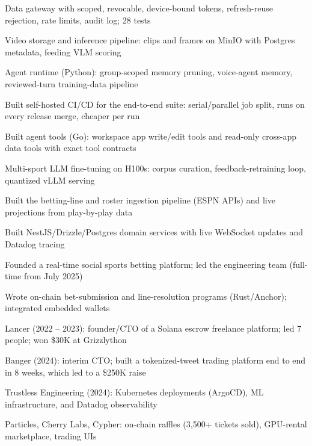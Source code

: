 \documentclass[print]{jack-resume}
\begin{document}
\begin{tightemize}
    \item Data gateway with scoped, revocable, device-bound tokens, refresh-reuse rejection, rate limits, audit log; 28 tests
    \item Video storage and inference pipeline: clips and frames on MinIO with Postgres metadata, feeding VLM scoring
    \item Agent runtime (Python): group-scoped memory pruning, voice-agent memory, reviewed-turn training-data pipeline
    \item Built self-hosted CI/CD for the end-to-end suite: serial/parallel job split, runs on every release merge, cheaper per run
    \item Built agent tools (Go): workspace app write/edit tools and read-only cross-app data tools with exact tool contracts
    \item Multi-sport LLM fine-tuning on H100s: corpus curation, feedback-retraining loop, quantized vLLM serving
\end{tightemize}
\sectionsep

\begin{tightemize}
    \item Built the betting-line and roster ingestion pipeline (ESPN APIs) and live projections from play-by-play data
    \item Built NestJS/Drizzle/Postgres domain services with live WebSocket updates and Datadog tracing
    \item Founded a real-time social sports betting platform; led the engineering team (full-time from July 2025)
    \item Wrote on-chain bet-submission and line-resolution programs (Rust/Anchor); integrated embedded wallets
\end{tightemize}
\sectionsep

\begin{tightemize}
    \item Lancer (2022 – 2023): founder/CTO of a Solana escrow freelance platform; led 7 people; won \$30K at Grizzlython
    \item Banger (2024): interim CTO; built a tokenized-tweet trading platform end to end in 8 weeks, which led to a \$250K raise
    \item Trustless Engineering (2024): Kubernetes deployments (ArgoCD), ML infrastructure, and Datadog observability
    \item Particles, Cherry Labs, Cypher: on-chain raffles (3,500+ tickets sold), GPU-rental marketplace, trading UIs
\end{tightemize}
\sectionsep
\end{document}

